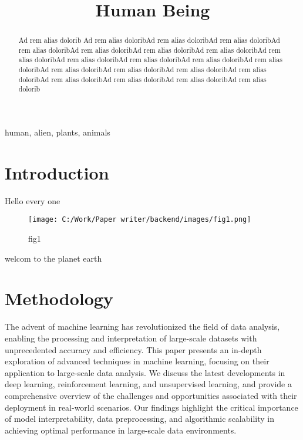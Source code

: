 \documentclass[conference]{IEEEtran}
\begin{document}
\title{Human Being}

\author{
  
}

\maketitle

\begin{abstract}
Ad rem alias dolorib Ad rem alias doloribAd rem alias doloribAd rem alias doloribAd rem alias doloribAd rem alias doloribAd rem alias doloribAd rem alias doloribAd rem alias doloribAd rem alias doloribAd rem alias doloribAd rem alias doloribAd rem alias doloribAd rem alias doloribAd rem alias doloribAd rem alias doloribAd rem alias doloribAd rem alias doloribAd rem alias doloribAd rem alias doloribAd rem alias dolorib
\end{abstract}

\begin{IEEEkeywords}
human, alien, plants, animals
\end{IEEEkeywords}

\section{Introduction}



Hello every one




\begin{figure}[htbp]
\centering
\texttt{[image: C:/Work/Paper writer/backend/images/fig1.png]}
\caption{fig1}
\label{fig:undefined}
\end{figure}
welcom to the planet earth


\section{Methodology}



The advent of machine learning has revolutionized the field of data analysis, enabling the processing and interpretation of large-scale datasets with unprecedented accuracy and efficiency. This paper presents an in-depth exploration of advanced techniques in machine learning, focusing on their application to large-scale data analysis. We discuss the latest developments in deep learning, reinforcement learning, and unsupervised learning, and provide a comprehensive overview of the challenges and opportunities associated with their deployment in real-world scenarios. Our findings highlight the critical importance of model interpretability, data preprocessing, and algorithmic scalability in achieving optimal performance in large-scale data environments.
\end{document}
